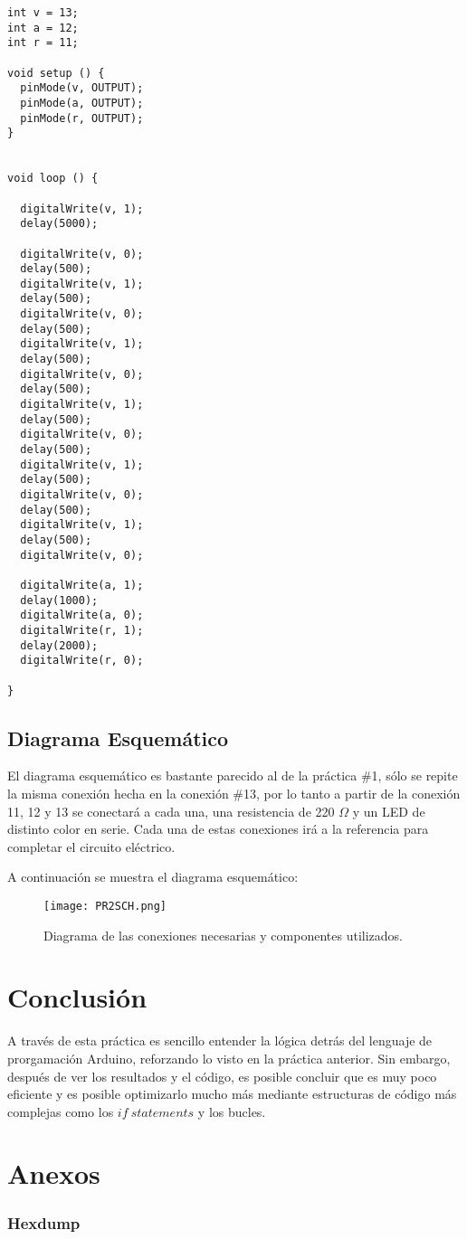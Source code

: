 \documentclass[12pt, letterpaper]{article}
\begin{document}
\begin{lstlisting}[language=Arduino]
int v = 13;
int a = 12;
int r = 11;

void setup () {
  pinMode(v, OUTPUT);
  pinMode(a, OUTPUT);
  pinMode(r, OUTPUT);
}


void loop () {
  
  digitalWrite(v, 1);
  delay(5000);
  
  digitalWrite(v, 0);
  delay(500);
  digitalWrite(v, 1);
  delay(500);
  digitalWrite(v, 0);
  delay(500);
  digitalWrite(v, 1);
  delay(500);
  digitalWrite(v, 0);
  delay(500);
  digitalWrite(v, 1);
  delay(500);
  digitalWrite(v, 0);
  delay(500);
  digitalWrite(v, 1);
  delay(500);
  digitalWrite(v, 0);
  delay(500);
  digitalWrite(v, 1);
  delay(500);
  digitalWrite(v, 0);
  
  digitalWrite(a, 1);
  delay(1000);
  digitalWrite(a, 0);
  digitalWrite(r, 1);
  delay(2000);
  digitalWrite(r, 0);
  
}

\end{lstlisting}
\subsection*{Diagrama Esquemático}
El diagrama esquemático es bastante parecido al de la práctica \#1, sólo se repite la misma conexión hecha en la conexión \#13, por lo tanto a partir de la conexión 11, 12 y 13 se conectará a cada una, una resistencia de 220 $\Omega$ y un LED de distinto color en serie. Cada una de estas conexiones irá a la referencia para completar el circuito eléctrico.

A continuación se muestra el diagrama esquemático:

\begin{figure}[H]
	\centering
	\texttt{[image: PR2SCH.png]}
	\caption{Diagrama de las conexiones necesarias y componentes utilizados.}
\end{figure}

\section*{Conclusión}

A través de esta práctica es sencillo entender la lógica detrás del lenguaje de prorgamación Arduino, reforzando lo visto en la práctica anterior. Sin embargo, después de ver los resultados y el código, es posible concluir que es muy poco eficiente y es posible optimizarlo mucho más mediante estructuras de código más complejas como los $if\ statements$ y los bucles.
\section*{Anexos}
\subsubsection*{Hexdump}
\scriptsize


\renewcommand\refname{References}
\printbibliography
\end{document}
